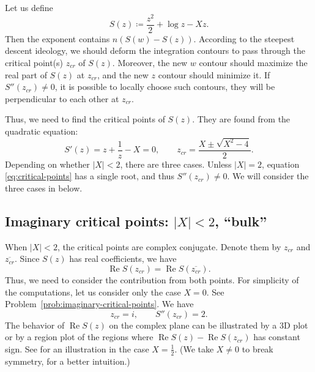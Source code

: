 \documentclass[letterpaper,11pt,oneside,reqno]{article}
\numberwithin{equation}{section}
\theoremstyle{definition}
\begin{document}
Let us define
\begin{equation*}
	S(z)\coloneqq
	\frac{z^2}{2}+\log z -X z.
\end{equation*}
Then the exponent contains $n \left( S(w)-S(z) \right)$.
According to the steepest descent ideology, we
should deform the integration contours
to pass through the critical point(s) $z_{cr}$ of $S(z)$.
Moreover, the new $w$ contour should maximize the real part of $S(z)$
at $z_{cr}$, and the new $z$ contour should minimize it.
If $S''(z_{cr})\ne 0$, it is possible to locally choose such contours,
they will be perpendicular to each other at $z_{cr}$.

Thus, we need to find the critical points of $S(z)$.
They are found from the quadratic equation:
\begin{equation}
	\label{eq:critical-points}
	S'(z)=z+\frac{1}{z}-X=0,\qquad
	z_{cr}=\frac{X\pm \sqrt{X^2-4}}{2}.
\end{equation}
Depending on whether $|X|<2$, there are three cases.
Unless $|X|=2$, equation \eqref{eq:critical-points} has a single root, and
thus $S''(z_{cr})\ne 0$.
We will consider the three cases in
below.

\subsection{Imaginary critical points: $|X|<2$, ``bulk''}
\label{sub:imaginary-critical-points}

When $|X|<2$, the critical points are complex conjugate.
Denote them by $z_{cr}$ and $\overline{z_{cr}}$.
Since $S(z)$ has real coefficients, we have
\begin{equation*}
	\operatorname{Re}S(z_{cr})=\operatorname{Re}S(\overline{z_{cr}}).
\end{equation*}
Thus, we need to consider the contribution from both points.
For simplicity of the computations, let us consider only the case $X=0$.
See Problem~\ref{prob:imaginary-critical-points}.
We have
\begin{equation*}
	z_{cr}=i,\qquad
	S''(z_{cr})=2.
\end{equation*}
The behavior of $\operatorname{Re}S(z)$ on the complex plane
can be illustrated by a 3D plot or by a region plot of the regions
where $\operatorname{Re}S(z)-\operatorname{Re}S(z_{cr})$ has constant sign.
See  for an illustration in the case $X=\frac{1}{2}$.
(We take $X\ne 0$ to break symmetry, for a better intuition.)
\end{document}
